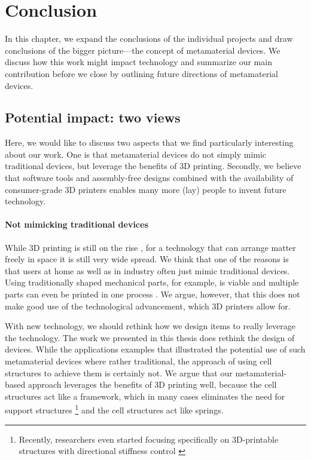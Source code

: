 \chapter{Conclusion}
\label{chapter:conclusion}

In this chapter, we expand the conclusions of the individual projects and draw conclusions of the bigger picture---the concept of metamaterial devices. We discuss how this work might impact technology and summarize our main contribution before we close by outlining future directions of metamaterial devices.


\section{Potential impact: two views}
Here, we would like to discuss two aspects that we find particularly interesting about our work. One is that metamaterial devices do not simply mimic traditional devices, but leverage the benefits of 3D printing. Secondly, we believe that software tools and assembly-free designs combined with the availability of consumer-grade 3D printers enables many more (lay) people to invent future technology. 

\subsubsection{Not mimicking traditional devices}
While 3D printing is still on the rise \cite{Sclupteo2018}, for a technology that can arrange matter freely in space it is still very wide spread. We think that one of the reasons is that users at home as well as in industry often just mimic traditional devices. Using traditionally shaped mechanical parts, for example, is viable and multiple parts can even be printed in one process \cite{Cali2012}. We argue, however, that this does not make good use of the technological advancement, which 3D printers allow for.  

With new technology, we should rethink how we design items to really leverage the technology. The work we presented in this thesis does rethink the design of devices. While the applications examples that illustrated the potential use of such metamaterial devices where rather traditional, the approach of using cell structures to achieve them is certainly not. We argue that our metamaterial-based approach leverages the benefits of 3D printing well, because the cell structures act like a framework, which in many cases eliminates the need for support structures
\footnote{Recently, researchers even started focusing specifically on 3D-printable structures with directional stiffness control \cite{Martinez2018}} 
and the cell structures act like springs. 

